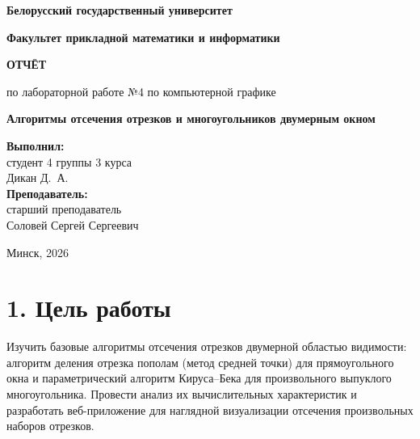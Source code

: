 \documentclass[11pt,a4paper]{article}
\begin{document}
\begin{titlepage}
    \centering
    {\bfseries\large Белорусский государственный университет\par}
    {\bfseries\large Факультет прикладной математики и информатики\par}
    
    \vspace{6cm}
    {\Huge\bfseries ОТЧЁТ\par}
    \vspace{0.5cm}
    {\large по лабораторной работе №4 по компьютерной графике\par}
    \vspace{0.5cm}
    {\Large\bfseries Алгоритмы отсечения отрезков и многоугольников двумерным окном\par}
    
    \vspace{6cm}
    \begin{flushright}
        \large
        \textbf{Выполнил:}\\
        студент 4 группы 3 курса\\
        Дикан Д.~А.\\[1em]
        \textbf{Преподаватель:}\\
        старший преподаватель\\
        Соловей Сергей Сергеевич
    \end{flushright}
    
    \vfill
    {\large Минск, 2026\par}
\end{titlepage}

\newpage

\section*{1. Цель работы}
Изучить базовые алгоритмы отсечения отрезков двумерной областью видимости: алгоритм деления отрезка пополам (метод средней точки) для прямоугольного окна и параметрический алгоритм Кируса--Бека для произвольного выпуклого многоугольника. Провести анализ их вычислительных характеристик и разработать веб-приложение для наглядной визуализации отсечения произвольных наборов отрезков.
\end{document}
